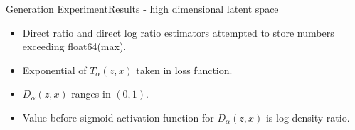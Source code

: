 \documentclass[handout]{beamer}
\begin{document}
\begin{frame}{Generation Experiment}{Results - high dimensional latent space}
\begin{table}[h]
\end{table}
\begin{itemize}
\item Direct ratio and direct log ratio estimators attempted to store numbers exceeding float64(max).
\vspace{0.5cm}
\item Exponential of $T_\alpha(z,x)$ taken in loss function.
\vspace{0.5cm}
\item $D_\alpha(z,x)$ ranges in $(0,1)$.
\vspace{0.5cm}
\item Value before sigmoid activation function for $D_\alpha(z,x)$ is log density ratio.
\end{itemize}
\end{frame}
\end{document}
